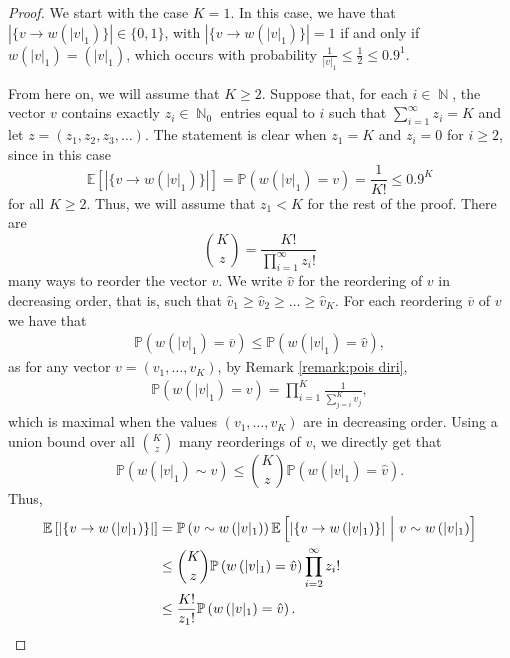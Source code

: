 \documentclass[10pt,a4paper]{amsart}
\newcommand{\E}{\mathbb{E}} %
\DeclareMathOperator{\N}{\mathbb{N}} %
\newcommand{\be}{\begin{equation}}
\newcommand{\ee}{\end{equation}}
\newcommand{\p}{\mathbb{P}} %
\begin{document}
\begin{proof} 
We start with the case $K=1$. In this case, we have that $|\{v\rightarrow w(|v|_1)\}| \in \{0,1\}$, with $|\{v\rightarrow w(|v|_1)\}| = 1$ if and only if $w(|v|_1) = (|v|_1)$, which occurs with probability $\frac{1}{|v|_1} \leq \frac{1}{2} \leq 0.9^1$.

From here on, we will assume that $K \geq 2$.
Suppose that, for each $i\in \N$, the vector $v$ contains exactly $z_i\in\N_0$ entries equal to $i$ such that $\sum_{i=1}^\infty z_i = K$ and let $z = (z_1, z_2, z_3, \dots)$.
The statement is clear when $z_1=K$ and $z_i = 0$ for $i\geq 2$, since in this case
\begin{equation*}
    \E[|\{v\rightarrow w(|v|_1)\}|] = \p \left( w(|v|_1) = v  \right) = \frac{1}{K!} \leq 0.9^K
\end{equation*}
for all $K \geq 2$. Thus, we will assume that $z_1 < K$ for the rest of the proof.
There are 
\be 
\binom{K}{z} = \frac{K!}{\prod_{i=1}^{\infty} z_i!}
\ee 
many ways to reorder the vector $v$. We write $\hat{v}$ for the reordering of $v$ in decreasing order, that is, such that $\hat{v}_1\geq \hat{v}_2\geq \ldots  \geq \hat{v}_K.$ For each reordering $\overline{v}$ of $v$ we have that 
\begin{align*}
	\p\left(w\left(|v|_1\right) = \overline{v} \right)
	\leq
	\p\left(w\left(|v|_1\right) =\hat{v} \right),
\end{align*}
as for any vector $v=(v_1,\ldots,v_K)$, by Remark \ref{remark:pois diri},
\begin{align}\label{eq:equality decreasing}
    \p\left(w\left(|v|_1\right) = v \right) = \prod_{i=1}^{K} \frac{1}{\sum_{j=i}^{K} v_j},
\end{align}
which is maximal when the values $(v_1,\ldots, v_K)$ are in decreasing order. Using a union bound over all $\binom{K}{z}$ many reorderings of $v$, we directly get that 
\be 
\p\left(w\left(|v|_1\right) \sim v \right) \leq \binom{K}{z} \p\left(w\left(|v|_1\right) = \hat{v} \right).
\ee
Thus,
\begin{align}\label{eq:isomorphis expect}
	 \notag \E \left[| \{ v \rightarrow w \left(|v|_1\right) \}|\right]  &= \p \left( v \sim w \left(|v|_1\right) \right)
	 \E \left[| \{ v \rightarrow w \left(|v|_1\right) \}| \ \Big| \ v \sim w \left(|v|_1\right) \right]\\
	 & \notag
	 \leq
	\binom{K}{z}
	\p\left(w\left(|v|_1\right) =  \hat{v}  \right)
	\prod_{i=2}^{\infty} z_i!\\
	&
	\leq 
	\frac{K!}{z_1! } \p\left(w\left(|v|_1\right) =  \hat{v}  \right).

\end{align}
\end{proof}
\end{document}
